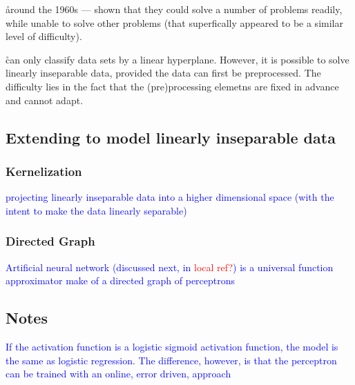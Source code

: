 \r{around the 1960s --- shown that they could solve a number of problems readily, while unable to solve other problems (that superfically appeared to be a similar level of difficulty). }

\r{can only classify data sets by a linear hyperplane. However, it is possible to solve linearly inseparable data, provided the data can first be preprocessed. The difficulty lies in the fact that the (pre)processing elemetns are fixed in advance and cannot adapt.}

\subsection{Extending to model linearly inseparable data}

\subsubsection{Kernelization}

\textcolor{blue}{projecting linearly inseparable data into a higher dimensional space (with the intent to make the data linearly separable)}

\subsubsection{Directed Graph}

\textcolor{blue}{Artificial neural network (discussed next, in \textcolor{red}{local ref?}) is a universal function approximator make of a directed graph of perceptrons}

\subsection{Notes}

\textcolor{blue}{If the activation function is a logistic sigmoid activation function, the model is the same as logistic regression.  The difference, however, is that the perceptron can be trained with an online, error driven, approach}
